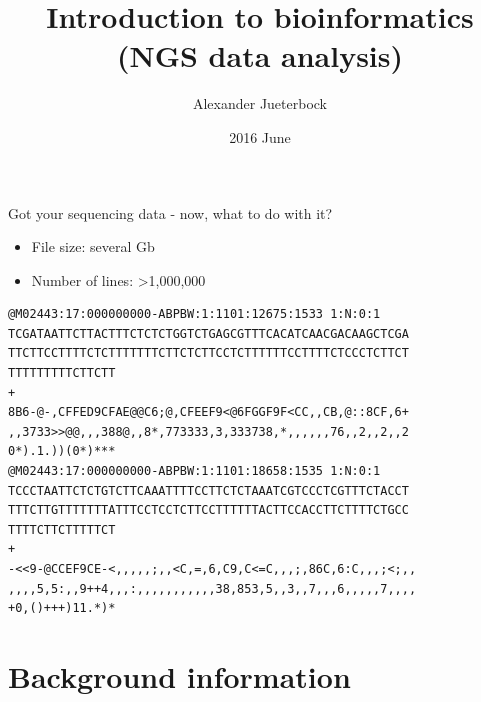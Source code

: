 \documentclass[presentation]{beamer}
\author{Alexander Jueterbock}
\date{2016 June}
\title{Introduction to bioinformatics (NGS data analysis)}
\begin{document}
\maketitle


\begin{frame}[fragile,label=sec-0-0-1]{Got your sequencing data - now, what to do with it?}
 \begin{footnotesize}
\begin{itemize}
\item File size: several Gb
\item Number of lines: >1,000,000
\end{itemize}

\begin{verbatim}
@M02443:17:000000000-ABPBW:1:1101:12675:1533 1:N:0:1
TCGATAATTCTTACTTTCTCTCTGGTCTGAGCGTTTCACATCAACGACAAGCTCGA
TTCTTCCTTTTCTCTTTTTTTCTTCTCTTCCTCTTTTTTCCTTTTCTCCCTCTTCT
TTTTTTTTTCTTCTT
+
8B6-@-,CFFED9CFAE@@C6;@,CFEEF9<@6FGGF9F<CC,,CB,@::8CF,6+
,,3733>>@@,,,388@,,8*,773333,3,333738,*,,,,,,76,,2,,2,,2
0*).1.))(0*)***
@M02443:17:000000000-ABPBW:1:1101:18658:1535 1:N:0:1
TCCCTAATTCTCTGTCTTCAAATTTTCCTTCTCTAAATCGTCCCTCGTTTCTACCT
TTTCTTGTTTTTTTATTTCCTCCTCTTCCTTTTTTACTTCCACCTTCTTTTCTGCC
TTTTCTTCTTTTTCT
+
-<<9-@CCEF9CE-<,,,,,;,,<C,=,6,C9,C<=C,,,;,86C,6:C,,,;<;,,
,,,,5,5:,,9++4,,,:,,,,,,,,,,,38,853,5,,3,,7,,,6,,,,,7,,,,
+0,()+++)11.*)*
\end{verbatim}

\end{footnotesize}
\end{frame}



\section{Background information}
\label{sec-1}
\end{document}
